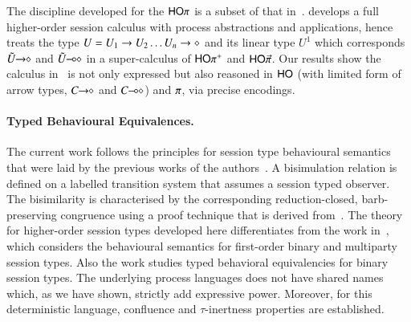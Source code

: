 The discipline developed for the $\mathsf{HO}\pi$ is a subset
of that in~\cite{tlca07,MostrousY15}.
\cite{tlca07} develops a full higher-order session calculus
with process abstractions and applications, hence  
treats the type 
$U=U_1 \rightarrow U_2 \dots U_n \rightarrow \diamond$ and its linear type 
$U^1$
which corresponds $\tilde{U}\!\! \rightarrow\!\! \diamond$ and $\tilde{U}\!\! \multimap\!\! \diamond$ in 
a super-calculus of $\mathsf{HO\pi^{+}}$ and $\mathsf{HO}{\vec{\pi}}$. 
Our results show
the calculus in~\cite{tlca07} is not only expressed but 
also reasoned in 
$\mathsf{HO}$ (with limited form of arrow types, $C\!\! \rightarrow\!\! \diamond$ and $C\!\! \multimap\!\! \diamond$) and 
$\pi$, via precise encodings. 

\paragraph{Typed Behavioural Equivalences.}
The current work follows the principles for
session type behavioural semantics that were laid
by the previous works of the
authors~\cite{dkphdthesis,DBLP:conf/forte/KouzapasYH11,KY13,DBLP:journals/iandc/PerezCPT14}.
A bisimulation relation is defined on a labelled
transition system that assumes a session typed
observer.
The bisimilarity is characterised by the corresponding
reduction-closed, barb-preserving congruence using a
proof technique that is derived from~\cite{Hennessy07}.
The theory for higher-order session types developed here
differentiates from 
the work in~\cite{dkphdthesis,DBLP:conf/forte/KouzapasYH11,KY13}, which 
considers the behavioural semantics for first-order
binary and multiparty session types.
Also the work \cite{DBLP:journals/iandc/PerezCPT14} studies typed behavioral equivalencies for binary session types.
The underlying process languages does not have shared names which, as we have shown, strictly add expressive power. 
Moreover, for this deterministic language, confluence and $\tau$-inertness properties are established.

